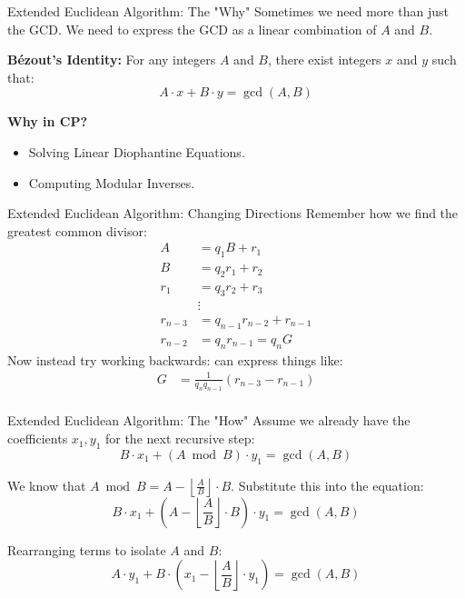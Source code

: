 \documentclass[aspectratio=169]{beamer}
\begin{document}
\begin{frame}{Extended Euclidean Algorithm: The "Why"}
    Sometimes we need more than just the GCD. We need to express the GCD as a linear combination of $A$ and $B$.
    
    \vspace{0.5cm}
    \textbf{Bézout's Identity:}
    For any integers $A$ and $B$, there exist integers $x$ and $y$ such that:
    $$A \cdot x + B \cdot y = \gcd(A, B)$$
    
    \textbf{Why in CP?}
    \begin{itemize}
        \item Solving Linear Diophantine Equations.
        \item Computing Modular Inverses.
    \end{itemize}
\end{frame}

\begin{frame}{Extended Euclidean Algorithm: Changing Directions}
    Remember how we find the greatest common divisor:
    \begin{align*}
    A &= q_1B+ r_1\\
    B &= q_2r_1 + r_2\\
    r_1 &= q_3r_2 + r_3\\
    &\vdots\\
    r_{n-3} &= q_{n-1} r_{n-2} + r_{n-1} \\
    r_{n-2} &= q_nr_{n-1} = q_nG
  \end{align*}
    Now instead try working backwards: can express things like:
    \begin{align*}
        G &= \frac{1}{q_n q_{n-1}}\left(r_{n-3} - r_{n-1}\right) \\
    \end{align*}
\end{frame}

\begin{frame}{Extended Euclidean Algorithm: The "How"}
    Assume we already have the coefficients $x_1, y_1$ for the next recursive step:
    $$B \cdot x_1 + (A \bmod B) \cdot y_1 = \gcd(A, B)$$
    
    We know that $A \bmod B = A - \left\lfloor \frac{A}{B} \right\rfloor \cdot B$. Substitute this into the equation:
    $$B \cdot x_1 + \left( A - \left\lfloor \frac{A}{B} \right\rfloor \cdot B \right) \cdot y_1 = \gcd(A, B)$$
    
    Rearranging terms to isolate $A$ and $B$:
    $$A \cdot y_1 + B \cdot \left( x_1 - \left\lfloor \frac{A}{B} \right\rfloor \cdot y_1 \right) = \gcd(A, B)$$
\end{frame}
\end{document}
